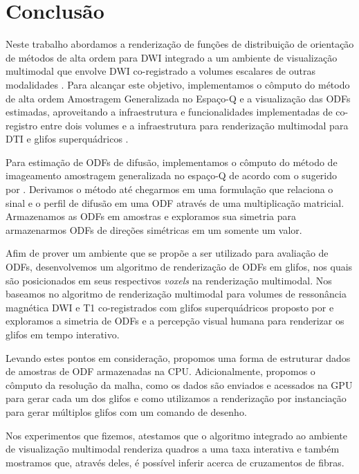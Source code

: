 \documentclass[
    12pt,                %
    oneside,            %
    a4paper,            %
    english,            %
    french,                %
    spanish,            %
    brazil                %
    ]{abntex2}
\begin{document}
\chapter{Conclusão}
\label{chap::conclusao}


Neste trabalho abordamos a renderização de funções de distribuição de orientação de métodos de alta ordem para DWI integrado a um ambiente de visualização multimodal que envolve DWI co-registrado a volumes escalares de outras modalidades \cite{VMTKNeuro}. Para alcançar este objetivo, implementamos o cômputo do método de alta ordem Amostragem Generalizada no Espaço-Q e a visualização das ODFs estimadas, aproveitando a infraestrutura e funcionalidades implementadas de co-registro entre dois volumes \cite{ting2014} e a infraestrutura para renderização multimodal para DTI e glifos superquádricos \cite{voltoline2021}.

Para estimação de ODFs de difusão, implementamos o cômputo do método de imageamento amostragem generalizada no espaço-Q de acordo com o sugerido por . Derivamos o método até chegarmos em uma formulação que relaciona o sinal e o perfil de difusão em uma ODF através de uma multiplicação matricial. Armazenamos as ODFs em amostras e exploramos sua simetria para armazenarmos ODFs de direções simétricas em um somente um valor.

Afim de prover um ambiente que se propõe a ser utilizado para avaliação de ODFs, desenvolvemos um algoritmo de renderização de ODFs em glifos, nos quais são posicionados em seus respectivos \textit{voxels} na renderização multimodal. Nos baseamos no algoritmo de renderização multimodal para volumes de ressonância magnética DWI e T1 co-registrados com glifos superquádricos proposto por  e exploramos a simetria de ODFs e a percepção visual humana para renderizar os glifos em tempo interativo.

Levando estes pontos em consideração, propomos uma forma de estruturar dados de amostras de ODF armazenadas na CPU. Adicionalmente, propomos o cômputo da resolução da malha, como os dados são enviados e acessados na GPU para gerar cada um dos glifos e como utilizamos a renderização por instanciação para gerar múltiplos glifos com um comando de desenho.

Nos experimentos que fizemos, atestamos que o algoritmo integrado ao ambiente de visualização multimodal renderiza quadros a uma taxa interativa e também mostramos que, através deles, é possível inferir acerca de cruzamentos de fibras.
\end{document}
